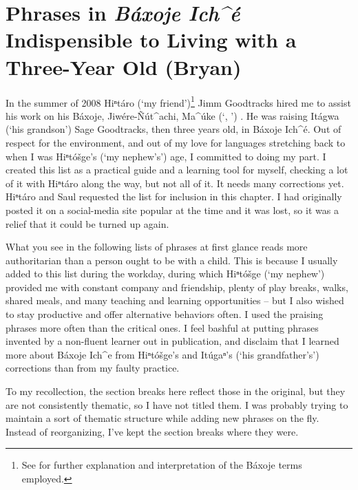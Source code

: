 \documentclass[output=paper]{LSP/langsci}
\begin{document}
\section{Phrases in \emph{Báxoje Ich\^{ }é} Indispensible to Living with a Three-Year Old (Bryan)}\label{bryan}
	In the summer of 2008 Hiⁿtáro (`my friend')\footnote{See  for further explanation and interpretation of the Báxoje  terms employed.} Jimm Goodtracks hired me to assist his work on his Báxoje, Jiwére-\~Nút\^{ }achi, Ma\^{ }úke (`, ') . He was raising Itágwa (`his grandson') Sage Goodtracks, then three years old, in Báxoje Ich\^{ }é. Out of respect for the  environment, and out of my love for languages stretching back to when I was Hiⁿtóšge's (`my nephew's') age, I committed to doing my part. I created this list as a practical guide and a learning tool for myself, checking a lot of it with Hiⁿtáro along the way, but not all of it. It needs many corrections yet. Hiⁿtáro and Saul requested the list for inclusion in this chapter. I had originally posted it on a social-media site popular at the time and it was lost, so it was a relief that it could be turned up again. 

What you see in the following lists of phrases
at first glance reads more authoritarian than a person ought to be with a child. This is because I usually added to this list during the workday, during which Hiⁿtóšge (`my nephew') provided me with constant company and friendship, plenty of play breaks, walks, shared meals, and many teaching and learning opportunities -- but I also wished to stay productive and offer alternative behaviors often. I used the praising phrases more often than the critical ones. I feel bashful at putting phrases invented by a non-fluent learner out in publication, and disclaim that I learned more about Báxoje Ich\^{ }e from Hiⁿtóšge's and Itúgaⁿ's (`his grandfather's') corrections than from my faulty practice. 

To my recollection, the section breaks here reflect those in the original, but they are not consistently thematic, so I have not titled them. I was probably trying to maintain a sort of thematic structure while adding new phrases on the fly. Instead of reorganizing, I've kept the section breaks where they were.

\end{document}
